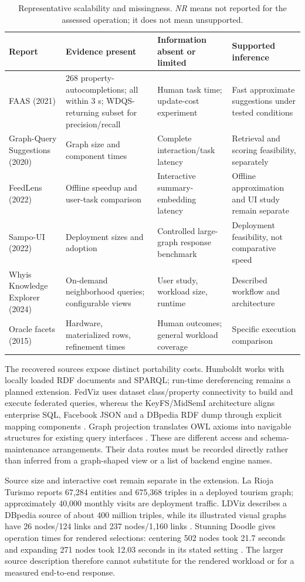 \documentclass[manuscript,review,screen]{acmart}
\newcommand{\NR}{\textit{NR}}
\begin{document}
\begin{table}[htbp]
\centering\small
\caption{Representative scalability and missingness. \NR{} means not reported for the assessed operation; it does not mean unsupported.}
\label{tab:missingness}
\begin{tabularx}{\linewidth}{L{28mm} Y Y Y}
\toprule Report & Evidence present & Information absent or limited & Supported inference\\\midrule
FAAS (2021) & 268 property-autocompletions; all within 3 s; WDQS-returning subset for precision/recall & Human task time; update-cost experiment & Fast approximate suggestions under tested conditions\\
Graph-Query Suggestions (2020) & Graph size and component times & Complete interaction/task latency & Retrieval and scoring feasibility, separately\\
FeedLens (2022) & Offline speedup and user-task comparison & Interactive summary-embedding latency & Offline approximation and UI study remain separate\\
Sampo-UI (2022) & Deployment sizes and adoption & Controlled large-graph response benchmark & Deployment feasibility, not comparative speed\\
Whyis Knowledge Explorer (2024) & On-demand neighborhood queries; configurable views & User study, workload size, runtime & Described workflow and architecture\\
Oracle facets (2015) & Hardware, materialized rows, refinement times & Human outcomes; general workload coverage & Specific execution comparison\\\bottomrule
\end{tabularx}
\end{table}

The recovered sources expose distinct portability costs. Humboldt works with locally loaded RDF documents and SPARQL; run-time dereferencing remains a planned extension. FedViz uses dataset class/property connectivity to build and execute federated queries, whereas the KeyFS/MidSemI architecture aligns enterprise SQL, Facebook JSON and a DBpedia RDF dump through explicit mapping components \citep{V3-01337,V3-01125,V3-01741}. Graph projection translates OWL axioms into navigable structures for existing query interfaces \citep{V3-01948}. These are different access and schema-maintenance arrangements. Their data routes must be recorded directly rather than inferred from a graph-shaped view or a list of backend engine names.

Source size and interactive cost remain separate in the extension. La Rioja Turismo reports 67,284 entities and 675,368 triples in a deployed tourism graph; approximately 40,000 monthly visits are deployment traffic. LDViz describes a DBpedia source of about 400 million triples, while its illustrated visual graphs have 26 nodes/124 links and 237 nodes/1,160 links \citep{V3-01709,V3-01178}. Stunning Doodle gives operation times for rendered selections: centering 502 nodes took 21.7 seconds and expanding 271 nodes took 12.03 seconds in its stated setting \citep{V3-02586}. The larger source description therefore cannot substitute for the rendered workload or for a measured end-to-end response.
\end{document}

